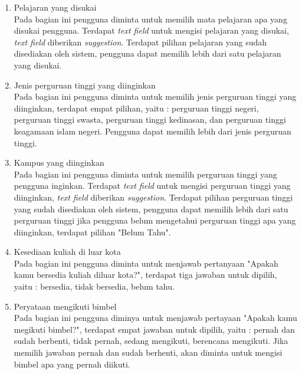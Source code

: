 \begin{enumerate}
\begin{enumerate}
\begin{enumerate}
                \item Pelajaran yang disukai\\
                    Pada bagian ini pengguna diminta untuk memilih mata pelajaran apa yang disukai pengguna.  Terdapat \textit{text field} untuk mengisi pelajaran yang disukai, \textit{text field} diberikan \textit{suggestion}. Terdapat pilihan pelajaran yang sudah disediakan oleh sistem, pengguna dapat memilih lebih dari satu pelajaran yang disukai.
                    
                \item Jenis perguruan tinggi yang diinginkan\\
                    Pada bagian ini pengguna diminta untuk memilih jenis perguruan tinggi yang diinginkan, terdapat empat pilihan, yaitu : perguruan tinggi negeri, perguruan tinggi swasta, perguruan tinggi kedinasan, dan perguruan tinggi keagamaan islam negeri. Pengguna dapat memilih lebih dari jenis perguruan tinggi.
                    
                \item Kampus yang diinginkan \\
                    Pada bagian ini pengguna diminta untuk memilih perguruan tinggi yang pengguna inginkan. Terdapat \textit{text field} untuk mengisi perguruan tinggi yang diinginkan, \textit{text field} diberikan \textit{suggestion}. Terdapat pilihan perguruan tinggi yang sudah disediakan oleh sistem, pengguna dapat memilih lebih dari satu perguruan tinggi jika pengguna belum mengetahui perguruan tinggi apa yang diinginkan, terdapat pilihan "Belum Tahu".
                    
                \item Kesediaan kuliah di luar kota \\
                    Pada bagian ini pengguna diminta untuk menjawab pertanyaan "Apakah kamu bersedia kuliah diluar kota?", terdapat tiga jawaban untuk dipilih, yaitu : bersedia, tidak bersedia, belum tahu.
                    
                \item Peryataan mengikuti bimbel \\
                    Pada bagian ini pengguna diminya untuk menjawab pertayaan "Apakah kamu megikuti bimbel?", terdapat empat jawaban untuk dipilih, yaitu : pernah dan sudah berbenti, tidak pernah, sedang mengikuti, berencana mengikuti. Jika memilih jawaban pernah dan sudah berhenti, akan diminta untuk mengisi bimbel apa yang pernah diikuti.
                    

\end{enumerate}
\end{enumerate}
\end{enumerate}
